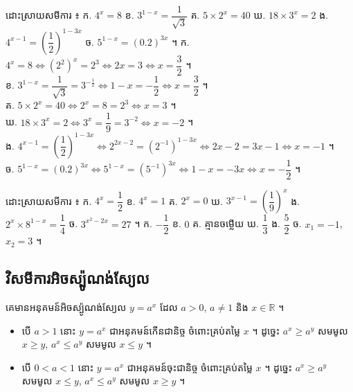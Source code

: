 \begin{example}[លំហាត់គំរូ]
ដោះស្រាយសមីការ ៖ \quad ក. $4^x = 8$ \quad ខ. $3^{1-x} = \dfrac{1}{\sqrt{3}}$ \quad គ. $5\times 2^x = 40$ \quad ឃ. $18\times 3^x = 2$ \quad ង. $4^{x-1} = \left(\dfrac{1}{2}\right)^{1-3x}$ \quad ច. $5^{1-x} = (0.2)^{3x}$ ។
\ans
ក. $4^x = 8 \Leftrightarrow (2^2)^x = 2^3 \Leftrightarrow 2x = 3 \Leftrightarrow x = \dfrac{3}{2}$ ។\\
ខ. $3^{1-x} = \dfrac{1}{\sqrt{3}} = 3^{-\frac{1}{2}} \Leftrightarrow 1 - x = -\dfrac{1}{2} \Leftrightarrow x = \dfrac{3}{2}$ ។\\
គ. $5\times 2^x = 40 \Leftrightarrow 2^x = 8 = 2^3 \Leftrightarrow x = 3$ ។\\
ឃ. $18\times 3^x = 2 \Leftrightarrow 3^x = \dfrac{1}{9} = 3^{-2} \Leftrightarrow x = -2$ ។\\
ង. $4^{x-1} = \left(\dfrac{1}{2}\right)^{1-3x} \Leftrightarrow 2^{2x-2} = (2^{-1})^{1-3x} \Leftrightarrow 2x - 2 = 3x - 1 \Leftrightarrow x = -1$ ។\\
ច. $5^{1-x} = (0.2)^{3x} \Leftrightarrow 5^{1-x} = (5^{-1})^{3x} \Leftrightarrow 1 - x = -3x \Leftrightarrow x = -\dfrac{1}{2}$ ។
\end{example}

\begin{pro}
ដោះស្រាយសមីការ ៖ \quad ក. $4^x = \dfrac{1}{2}$ \quad ខ. $4^x = 1$ \quad គ. $2^x = 0$ \quad ឃ. $3^{x-1} = \left(\dfrac{1}{9}\right)^x$ \quad ង. $2^x\times 8^{1-x} = \dfrac{1}{4}$ \quad ច. $3^{x^2 - 2x} = 27$ ។
\ans
ក. $-\dfrac{1}{2}$ \quad ខ. $0$ \quad គ. គ្មានចម្លើយ \quad ឃ. $\dfrac{1}{3}$ \quad ង. $\dfrac{5}{2}$ \quad ច. $x_1 = -1$, $x_2 = 3$ ។
\end{pro}

\subsection{វិសមីការអិចស្ប៉ូណង់ស្យែល}
\begin{example}[ឧទាហរណ៍]
គេមានអនុគមន៍អិចស្ប៉ូណង់ស្យែល $y = a^x$ ដែល $a > 0$, $a \ne 1$ និង $x \in \mathbb{R}$ ។
\end{example}
\begin{itemize}
  \item បើ $a > 1$ នោះ $y = a^x$ ជាអនុគមន៍កើនជានិច្ច ចំពោះគ្រប់តម្លៃ $x$ ។ ដូច្នេះ $a^x \ge a^y$ សមមូល $x \ge y$, $a^x \le a^y$ សមមូល $x \le y$ ។
  \item បើ $0 < a < 1$ នោះ $y = a^x$ ជាអនុគមន៍ចុះជានិច្ច ចំពោះគ្រប់តម្លៃ $x$ ។ ដូច្នេះ $a^x \ge a^y$ សមមូល $x \le y$, $a^x \le a^y$ សមមូល $x \ge y$ ។
\end{itemize}

